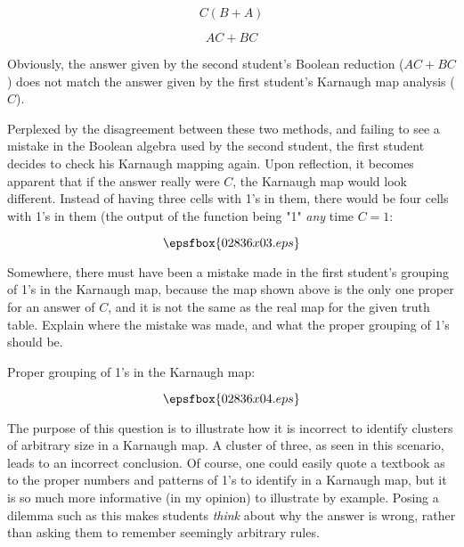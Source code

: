 $$C(B + A)$$

$$AC + BC$$

Obviously, the answer given by the second student's Boolean reduction ($AC + BC$) does not match the answer given by the first student's Karnaugh map analysis ($C$).

\vskip 10pt

Perplexed by the disagreement between these two methods, and failing to see a mistake in the Boolean algebra used by the second student, the first student decides to check his Karnaugh mapping again.  Upon reflection, it becomes apparent that if the answer really were $C$, the Karnaugh map would look different.  Instead of having three cells with 1's in them, there would be four cells with 1's in them (the output of the function being "1" {\it any} time $C = 1$:

$$\epsfbox{02836x03.eps}$$

Somewhere, there must have been a mistake made in the first student's grouping of 1's in the Karnaugh map, because the map shown above is the only one proper for an answer of $C$, and it is not the same as the real map for the given truth table.  Explain where the mistake was made, and what the proper grouping of 1's should be.







Proper grouping of 1's in the Karnaugh map:

$$\epsfbox{02836x04.eps}$$







The purpose of this question is to illustrate how it is incorrect to identify clusters of arbitrary size in a Karnaugh map.  A cluster of three, as seen in this scenario, leads to an incorrect conclusion.  Of course, one could easily quote a textbook as to the proper numbers and patterns of 1's to identify in a Karnaugh map, but it is so much more informative (in my opinion) to illustrate by example.  Posing a dilemma such as this makes students {\it think} about why the answer is wrong, rather than asking them to remember seemingly arbitrary rules.




